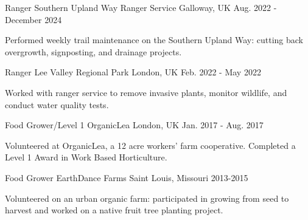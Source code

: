 \vspace{-2ex}
\begin{cventries}

    \cventry
 {Ranger}
    {Southern Upland Way Ranger Service}
    {Galloway, UK}
    {Aug. 2022 - December 2024}
    {
      \begin{cvitems}
        \item Performed weekly trail maintenance on the Southern Upland Way: cutting back overgrowth, signposting, and drainage projects. 
      \end{cvitems}
    }



    \vspace{-2ex}
   \cventry
 {Ranger}
    {Lee Valley Regional Park}
    {London, UK}
    {Feb. 2022 - May 2022}
    {
      \begin{cvitems}
        \item Worked with ranger service to remove invasive plants, monitor wildlife, and conduct water quality tests.
      \end{cvitems}
    }
    
    
        \vspace{-2ex}
    \cventry
 {Food Grower/Level 1}
    {OrganicLea}
    {London, UK}
    {Jan. 2017 - Aug. 2017}
    {
      \begin{cvitems}
        \item {Volunteered at OrganicLea, a 12 acre workers' farm cooperative. Completed a Level 1 Award in Work Based Horticulture.}
      \end{cvitems}
      } 
      
      \vspace{-2ex}
      \cventry
    {Food Grower}
    {EarthDance Farms}
    {Saint Louis, Missouri}
    {2013-2015}
    {
      \begin{cvitems}
        \item {Volunteered on an urban organic farm: participated in growing from seed to harvest and worked on a native fruit tree planting project.}
      \end{cvitems}
    }
  
  
\end{cventries}